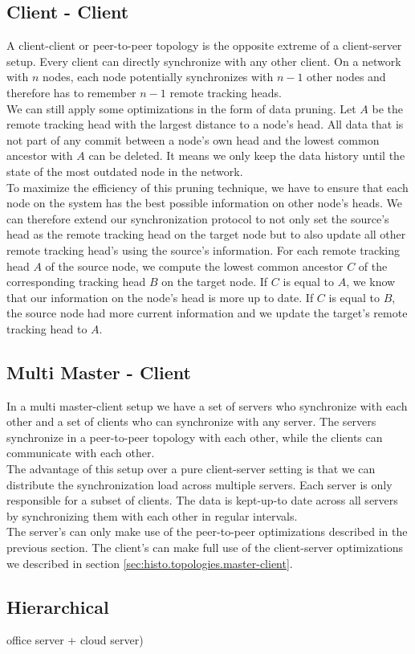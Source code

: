 \subsection{Client - Client}
A client-client or peer-to-peer topology is the opposite extreme of a client-server setup.
Every client can directly synchronize with any other client.
On a network with $ n $ nodes, each node potentially synchronizes with $ n - 1 $ other nodes and therefore has to remember $ n - 1 $ remote tracking heads.\\
We can still apply some optimizations in the form of data pruning.
Let $ A $ be the remote tracking head with the largest distance to a node's head.
All data that is not part of any commit between a node's own head and the lowest common ancestor with $ A $ can be deleted.
It means we only keep the data history until the state of the most outdated node in the network.\\
To maximize the efficiency of this pruning technique, we have to ensure that each node on the system has the best possible information on other node's heads.
We can therefore extend our synchronization protocol to not only set the source's head as the remote tracking head on the target node but to also update all other remote tracking head's using the source's information.
For each remote tracking head $ A $ of the source node, we compute the lowest common ancestor $ C $ of the corresponding tracking head $ B $ on the target node.
If $ C $ is equal to $ A $, we know that our information on the node's head is more up to date.
If $ C $ is equal to $ B $, the source node had more current information and we update the target's remote tracking head to $ A $.

\subsection{Multi Master - Client}
In a multi master-client setup we have a set of servers who synchronize with each other and a set of clients who can synchronize with any server.
The servers synchronize in a peer-to-peer topology with each other, while the clients can communicate with each other.\\
The advantage of this setup over a pure client-server setting is that we can distribute the synchronization load across multiple servers.
Each server is only responsible for a subset of clients.
The data is kept-up-to date across all servers by synchronizing them with each other in regular intervals.\\
The server's can only make use of the peer-to-peer optimizations described in the previous section.
The client's can make full use of the client-server optimizations we described in section \ref{sec:histo.topologies.master-client}.

\subsection{Hierarchical}
office server + cloud server)

